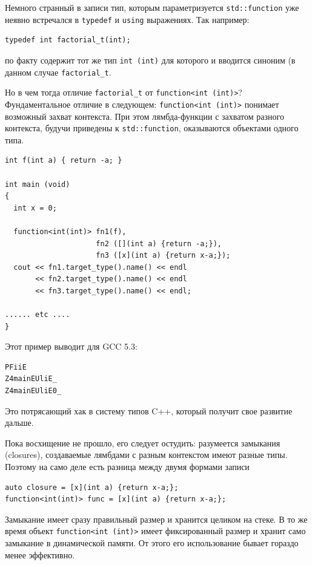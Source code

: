 \documentclass[a4paper,12pt,oneside]{article}
\begin{document}
Немного странный в записи тип, которым параметризуется \lstinline!std::function! уже неявно встречался в \lstinline!typedef! и \lstinline!using! выражениях. Так например:

\begin{lstlisting}
typedef int factorial_t(int);
\end{lstlisting}

по факту содержит тот же тип \lstinline!int (int)! для которого и вводится синоним (в данном случае \lstinline!factorial_t!.

Но в чем тогда отличие \lstinline!factorial_t! от \lstinline!function<int (int)>!? Фундаментальное отличие в следующем: \lstinline!function<int (int)>! понимает возможный захват контекста. При этом лямбда-функции с захватом разного контекста, будучи приведены к \lstinline!std::function!, оказываются объектами одного типа.

\begin{lstlisting}
int f(int a) { return -a; }

int main (void)
{
  int x = 0;

  function<int(int)> fn1(f),
                     fn2 ([](int a) {return -a;}),
                     fn3 ([x](int a) {return x-a;});
  cout << fn1.target_type().name() << endl
       << fn2.target_type().name() << endl
       << fn3.target_type().name() << endl;

...... etc ....
}
\end{lstlisting}

Этот пример выводит для GCC 5.3: 

\begin{verbatim}
PFiiE
Z4mainEUliE_
Z4mainEUliE0_
\end{verbatim}

Это потрясающий хак в систему типов C++, который получит свое развитие дальше.

Пока восхищение не прошло, его следует остудить: разумеется замыкания (closures), создаваемые лямбдами с разным контекстом имеют разные типы. Поэтому на само деле есть разница между двумя формами записи

\begin{lstlisting}
auto closure = [x](int a) {return x-a;};
function<int(int)> func = [x](int a) {return x-a;};
\end{lstlisting}

Замыкание имеет сразу правильный размер и хранится целиком на стеке. В то же время объект \lstinline!function<int (int)>! имеет фиксированный размер и хранит само замыкание в динамической памяти. От этого его использование бывает гораздо менее эффективно.
\end{document}
